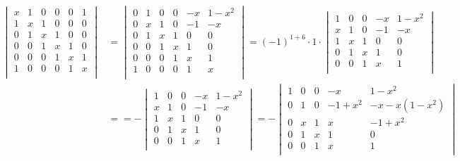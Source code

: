 \documentclass[11pt,pra,aps]{revtex4}
\begin{document}
\begin{align}
  \begin{vmatrix}
    x & 1 & 0 & 0 & 0 & 1 \\
    1 & x & 1 & 0 & 0 & 0 \\
    0 & 1 & x & 1 & 0 & 0 \\
    0 & 0 & 1 & x & 1 & 0 \\
    0 & 0 & 0 & 1 & x & 1 \\
    1 & 0 & 0 & 0 & 1 & x \\                        
  \end{vmatrix}
  &=
  \begin{vmatrix}
    0 & 1 & 0 & 0 & -x & 1-x^2 \\
    0 & x & 1 & 0 & -1 & -x \\
    0 & 1 & x & 1 & 0 & 0 \\
    0 & 0 & 1 & x & 1 & 0 \\
    0 & 0 & 0 & 1 & x & 1 \\
    1 & 0 & 0 & 0 & 1 & x \\                        
  \end{vmatrix}
  =(-1)^{1+6}\cdot 1\cdot
  \begin{vmatrix}
    1 & 0 & 0 & -x & 1-x^2 \\
    x & 1 & 0 & -1 & -x \\
    1 & x & 1 & 0 & 0 \\
    0 & 1 & x & 1 & 0 \\
    0 & 0 & 1 & x & 1 \\
  \end{vmatrix} \nonumber \\
  &=
  =-
  \begin{vmatrix}
    1 & 0 & 0 & -x & 1-x^2 \\
    x & 1 & 0 & -1 & -x \\
    1 & x & 1 & 0 & 0 \\
    0 & 1 & x & 1 & 0 \\
    0 & 0 & 1 & x & 1 \\
  \end{vmatrix}
  =-
  \begin{vmatrix}
    1 & 0 & 0 & -x & 1-x^2 \\
    0 & 1 & 0 & -1+x^2 & -x-x(1-x^2) \\
    0 & x & 1 & x & -1+x^2 \\
    0 & 1 & x & 1 & 0 \\
    0 & 0 & 1 & x & 1 \\
  \end{vmatrix} \nonumber \\

\end{align}
\end{document}
